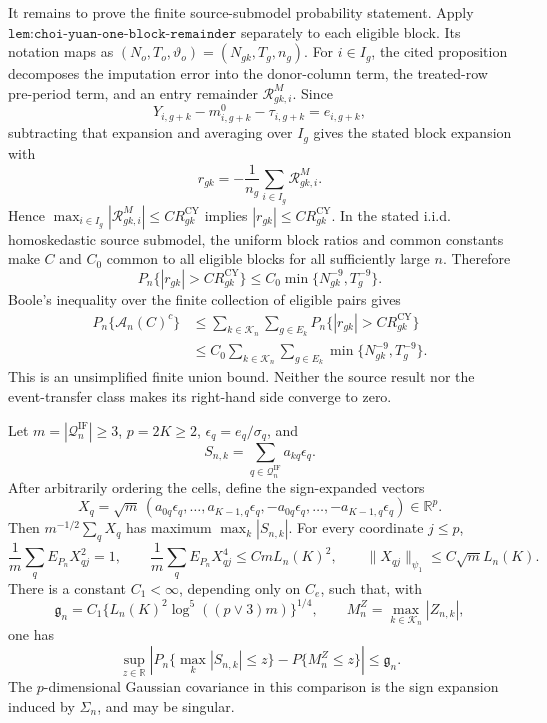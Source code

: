 It remains to prove the finite source-submodel probability statement.
Apply \(\texttt{lem:choi-yuan-one-block-remainder}\) separately to each
eligible block.  Its notation maps as
\((N_o,T_o,\vartheta_o)=(N_{gk},T_g,n_g)\).  For \(i\in I_g\), the cited
proposition decomposes the imputation error into the donor-column term,
the treated-row pre-period term, and an entry remainder
\(\mathcal R^M_{gk,i}\).  Since
\[
 Y_{i,g+k}-m^0_{i,g+k}-\tau_{i,g+k}=e_{i,g+k},
\]
subtracting that expansion and averaging over \(I_g\) gives the stated
block expansion with
\[
 r_{gk}=-\frac1{n_g}\sum_{i\in I_g}\mathcal R^M_{gk,i}.
\]
Hence
\(\max_{i\in I_g}|\mathcal R^M_{gk,i}|\le
C R_{gk}^{\mathrm{CY}}\) implies
\(|r_{gk}|\le C R_{gk}^{\mathrm{CY}}\).  In the stated i.i.d.
homoskedastic source submodel, the uniform block ratios and common
constants make \(C\) and \(C_0\) common to all eligible blocks for all
sufficiently large \(n\).  Therefore
\[
 P_n\{|r_{gk}|>C R_{gk}^{\mathrm{CY}}\}
 \le C_0\min\{N_{gk}^{-9},T_g^{-9}\}.
\]
Boole's inequality over the finite collection of eligible pairs gives
\[
 \begin{aligned}
 P_n\{\mathcal A_n(C)^c\}
 &\le\sum_{k\in\mathcal K_n}\sum_{g\in E_k}
 P_n\{|r_{gk}|>C R_{gk}^{\mathrm{CY}}\}\\
 &\le C_0\sum_{k\in\mathcal K_n}\sum_{g\in E_k}
 \min\{N_{gk}^{-9},T_g^{-9}\}.
 \end{aligned}
\]
This is an unsimplified finite union bound.  Neither the source result nor
the event-transfer class makes its right-hand side converge to zero.

Let \(m=|\mathcal Q_n^{\mathrm{IF}}|\ge3\), \(p=2K\ge2\),
\(\epsilon_q=e_q/\sigma_q\), and
\[
 S_{n,k}=\sum_{q\in\mathcal Q_n^{\mathrm{IF}}}a_{kq}\epsilon_q.
\]
After arbitrarily ordering the cells, define the sign-expanded vectors
\[
 X_q=\sqrt m\,(a_{0q}\epsilon_q,\ldots,
 a_{K-1,q}\epsilon_q,-a_{0q}\epsilon_q,\ldots,
 -a_{K-1,q}\epsilon_q)\in\mathbb R^p.
\]
Then \(m^{-1/2}\sum_qX_q\) has maximum
\(\max_k|S_{n,k}|\).  For every coordinate \(j\le p\),
\[
 \frac1m\sum_qE_{P_n}X_{qj}^2=1,
 \qquad
 \frac1m\sum_qE_{P_n}X_{qj}^4
 \le C mL_n(K)^2,
 \qquad
 \|X_{qj}\|_{\psi_1}\le C\sqrt mL_n(K).
\]
There is a constant \(C_1<\infty\), depending only on \(C_e\), such
that, with
\[
 \mathfrak g_n=C_1\{L_n(K)^2\log^5((p\vee3)m)\}^{1/4},
 \qquad M_n^Z=\max_{k\in\mathcal K_n}|Z_{n,k}|,
\]
one has
\[
 \sup_{z\in\mathbb R}
 \left|P_n\{\max_k|S_{n,k}|\le z\}-P\{M_n^Z\le z\}\right|
 \le\mathfrak g_n.
\]
The \(p\)-dimensional Gaussian covariance in this comparison is the
sign expansion induced by \(\Sigma_n\), and may be singular.

